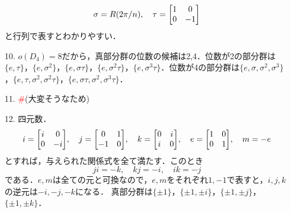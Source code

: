 \documentclass[a4paper,10pt,uplatex]{jsarticle}
\newcommand{\miss}{\textcolor{red}{\#}}
\numberwithin{equation}{section}
\theoremstyle{mystyle}
\begin{document}
\begin{itemize}
    \begin{equation}
        \sigma = R(2\pi/n),\quad \tau = \mqty[1 & 0\\0 & -1]
    \end{equation}
    と行列で表すとわかりやすい．
    \item[10.] $o(D_4) = 8$だから，真部分群の位数の候補は2,4．位数が2の部分群は$\{e,\tau\}$，$\{e,\sigma^2\}$，$\{e,\sigma\tau\}$，$\{e,\sigma^2 \tau\}$，$\{e,\sigma^3 \tau\}$．位数が4の部分群は$\{e,\sigma,\sigma^2,\sigma^3\}$，$\{e,\tau,\sigma^2,\sigma^2\tau\}$，$\{e,\sigma\tau,\sigma^2,\sigma^3\tau\}$．
    \item[11.] \miss(大変そうなため)
    \item[12.] 四元数．
    \begin{equation}
        i = \mqty[i & 0 \\ 0 & -i],\quad j = \mqty[0 & 1 \\ -1 & 0],\quad k = \mqty[0 & i \\ i & 0],\quad e = \mqty[\imat{2}], \quad m = -e
    \end{equation}
    とすれば，与えられた関係式を全て満たす．このとき
    \begin{equation}
        ji = -k,\quad kj = -i,\quad ik = -j
    \end{equation}
    である．$e,m$は全ての元と可換なので，$e,m$をそれぞれ$1,-1$で表すと，$i,j,k$の逆元は$-i,-j,-k$になる．
    真部分群は$\{\pm 1\}$，$\{\pm 1, \pm i\}$，$\{\pm 1, \pm j\}$，$\{\pm 1, \pm k\}$．
\end{itemize}
\end{document}
